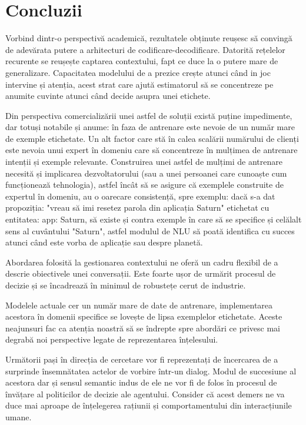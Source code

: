 \chapter{Concluzii}

Vorbind dintr-o perspectivă academică, rezultatele obținute reușesc să convingă de adevărata putere a arhitecturi de codificare-decodificare.
Datorită rețelelor recurente se reușește captarea contextului, fapt ce duce la o putere mare de generalizare. Capacitatea modelului de a prezice crește atunci când in joc intervine și atenția, acest strat care ajută estimatorul să se concentreze pe anumite cuvinte atunci când decide asupra unei etichete.

Din perspectiva comercializării unei astfel de soluții există puține impedimente, dar totuși notabile și anume: în faza de antrenare este nevoie de un număr mare de exemple etichetate. Un alt factor care stă în calea scalării numărului de clienți este nevoia unui expert în domeniu care să concentreze în mulțimea de antrenare intenții și exemple relevante. Construirea unei astfel de mulțimi de antrenare necesită și implicarea dezvoltatorului (sau a unei persoanei care cunoaște cum funcționează tehnologia), astfel încât să se asigure că exemplele construite de expertul în domeniu, au o oarecare consistență, spre exemplu: dacă s-a dat propoziția: "vreau să imi resetez parola din aplicația Saturn" etichetat cu entitatea: app: Saturn, să existe și contra exemple în care să se specifice și celălalt sens al cuvântului "Saturn", astfel modulul de NLU să poată identifica cu succes atunci când este vorba de aplicație sau despre planetă.

Abordarea folosită la gestionarea contextului ne oferă un cadru flexibil de a descrie obiectivele unei conversații. Este foarte ușor de urmărit procesul de decizie și se încadrează în minimul de robustețe cerut de industrie.


Modelele actuale cer un număr mare de date de antrenare, implementarea acestora în domenii specifice se lovește de lipsa exemplelor etichetate. Aceste neajunsuri fac ca atenția noastră să se îndrepte spre abordări ce privesc mai degrabă noi perspective legate de reprezentarea înțelesului.

Următorii pași în direcția de cercetare vor fi reprezentați de încercarea de a surprinde însemnătatea actelor de vorbire într-un dialog. Modul de succesiune al acestora dar și sensul semantic indus de ele ne vor fi de folos în procesul de învățare al politicilor de decizie ale agentului. Consider că acest demers ne va duce mai aproape de înțelegerea rațiunii și comportamentului din interacțiunile umane.
